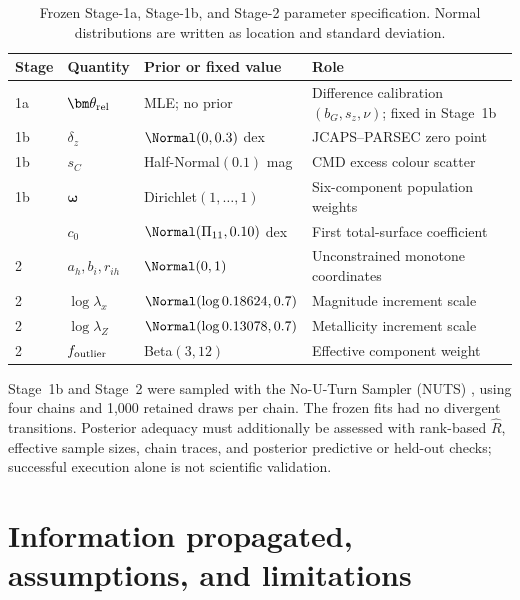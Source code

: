 \begin{table}[htbp]
\centering
\caption{Frozen Stage-1a, Stage-1b, and Stage-2 parameter specification.  Normal
distributions are written as location and standard deviation.}
\label{tab:priors}
\begin{tabularx}{\textwidth}{@{}lllX@{}}
\toprule
Stage & Quantity & Prior or fixed value & Role \\
\midrule
1a & $\bm\theta_{\rm rel}$ & MLE; no prior & Difference calibration $(b_G,s_z,\nu)$; fixed in Stage~1b \\
1b & $\delta_z$ & $\Normal(0,0.3)$ dex & JCAPS--PARSEC zero point \\
1b & $s_C$ & Half-Normal$(0.1)$ mag & CMD excess colour scatter \\
1b & $\bm\omega$ & Dirichlet$(1,\ldots,1)$ & Six-component population weights \\
\addlinespace
2 & $c_0$ & $\Normal(\Pi_{11},0.10)$ dex & First total-surface coefficient \\
2 & $a_h,b_i,r_{ih}$ & $\Normal(0,1)$ & Unconstrained monotone coordinates \\
2 & $\log\lambda_x$ & $\Normal(\log0.18624,0.7)$ & Magnitude increment scale \\
2 & $\log\lambda_Z$ & $\Normal(\log0.13078,0.7)$ & Metallicity increment scale \\
2 & $f_{\rm outlier}$ & Beta$(3,12)$ & Effective component weight \\
\bottomrule
\end{tabularx}
\end{table}
\FloatBarrier

Stage~1b and Stage~2 were sampled with the No-U-Turn Sampler (NUTS)
\citep{HoffmanGelman2014NUTS}, using four chains and 1,000 retained draws per
chain.  The frozen fits had no divergent transitions.  Posterior adequacy must
additionally be assessed with rank-based
$\widehat R$, effective sample sizes, chain traces, and posterior predictive or
held-out checks; successful execution alone is not scientific validation.

\section{Information propagated, assumptions, and limitations}
\label{sec:limitations}


